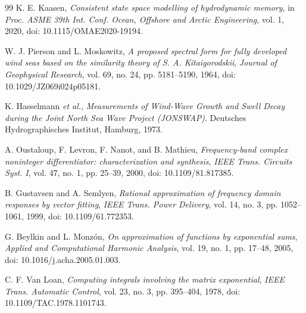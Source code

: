 \documentclass[10pt,journal]{IEEEtran}
\begin{document}
\begin{thebibliography}{99}
K. E. Kaasen, \emph{Consistent state space modelling of hydrodynamic
memory}, in \emph{Proc. ASME 39th Int. Conf. Ocean, Offshore
and Arctic Engineering}, vol. 1, 2020,
doi: 10.1115/OMAE2020-19194.

W. J. Pierson and L. Moskowitz, \emph{A proposed spectral form for
fully developed wind seas based on the similarity theory of
S. A. Kitaigorodskii}, \emph{Journal of Geophysical Research},
vol. 69, no. 24, pp. 5181--5190, 1964,
doi: 10.1029/JZ069i024p05181.

K. Hasselmann \emph{et al.}, \emph{Measurements of Wind-Wave
Growth and Swell Decay during the Joint North Sea Wave Project
(JONSWAP)}. Deutsches Hydrographisches Institut, Hamburg, 1973.

A. Oustaloup, F. Levron, F. Nanot, and B. Mathieu,
\emph{Frequency-band complex noninteger differentiator:
characterization and synthesis},
\emph{IEEE Trans. Circuits Syst. I}, vol. 47, no. 1,
pp. 25--39, 2000, doi: 10.1109/81.817385.

B. Gustavsen and A. Semlyen, \emph{Rational approximation of frequency
domain responses by vector fitting},
\emph{IEEE Trans. Power Delivery}, vol. 14, no. 3,
pp. 1052--1061, 1999, doi: 10.1109/61.772353.

G. Beylkin and L. Monz\'on, \emph{On approximation of functions by
exponential sums}, \emph{Applied and Computational Harmonic Analysis},
vol. 19, no. 1, pp. 17--48, 2005,
doi: 10.1016/j.acha.2005.01.003.

C. F. Van Loan, \emph{Computing integrals involving the matrix
exponential}, \emph{IEEE Trans. Automatic Control},
vol. 23, no. 3, pp. 395--404, 1978,
doi: 10.1109/TAC.1978.1101743.
\end{thebibliography}
\end{document}

